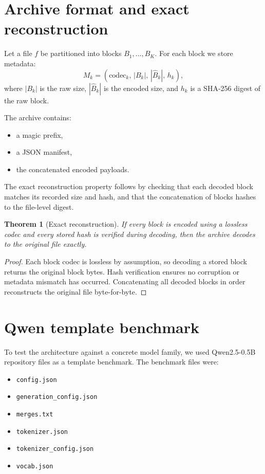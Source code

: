 \documentclass[11pt]{article}
\newtheorem{theorem}{Theorem}
\begin{document}
\section{Archive format and exact reconstruction}

Let a file $f$ be partitioned into blocks $B_1,\dots,B_K$. For each block we store metadata:
\[
M_k = (\text{codec}_k,\, |B_k|,\, |\hat B_k|,\, h_k),
\]
where $|B_k|$ is the raw size, $|\hat B_k|$ is the encoded size, and $h_k$ is a SHA-256 digest of the raw block.

The archive contains:
\begin{itemize}
\item a magic prefix,
\item a JSON manifest,
\item the concatenated encoded payloads.
\end{itemize}

The exact reconstruction property follows by checking that each decoded block matches its recorded size and hash, and that the concatenation of blocks hashes to the file-level digest.

\begin{theorem}[Exact reconstruction]
If every block is encoded using a lossless codec and every stored hash is verified during decoding, then the archive decodes to the original file exactly.
\end{theorem}

\begin{proof}
Each block codec is lossless by assumption, so decoding a stored block returns the original block bytes. Hash verification ensures no corruption or metadata mismatch has occurred. Concatenating all decoded blocks in order reconstructs the original file byte-for-byte.
\end{proof}

\section{Qwen template benchmark}

To test the architecture against a concrete model family, we used Qwen2.5-0.5B repository files as a template benchmark. The benchmark files were:
\begin{itemize}
\item \texttt{config.json}
\item \texttt{generation\_config.json}
\item \texttt{merges.txt}
\item \texttt{tokenizer.json}
\item \texttt{tokenizer\_config.json}
\item \texttt{vocab.json}
\end{itemize}
\end{document}
